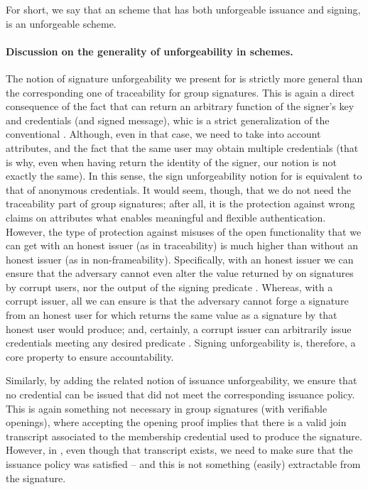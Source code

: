 For short, we say that an \UAS scheme that has both unforgeable issuance and
signing, is an unforgeable \UAS scheme.

\paragraph{Discussion on the generality of unforgeability in \UAS schemes.} %
The notion of signature unforgeability we present for \UAS is strictly more
general than the corresponding one of traceability for group signatures. This is
again a direct consequence of the fact that \Open can return an arbitrary
function of the signer's key and credentials (and signed message), whic is a
strict generalization of the conventional \Open. Although, even in that case, we
need to take into account attributes, and the fact that the same user may obtain
multiple credentials (that is why, even when having \Open return the identity of
the signer, our notion is not exactly the same). In this sense, the sign
unforgeability notion for \UAS is equivalent to that of anonymous
credentials. It would seem, though, that we do not need the traceability part of
group signatures; after all, it is the protection against wrong claims on
attributes what enables meaningful and flexible authentication. However, the
type of protection against misuses of the open functionality that we can
get with an honest issuer (as in traceability) is much higher than without an
honest issuer (as in non-frameability). Specifically, with an honest issuer we
can ensure that the adversary cannot even alter the value returned by \Open on
signatures by corrupt users, nor the output of the signing predicate \feval.
Whereas, with a corrupt issuer, all we can ensure is that
the adversary cannot forge a signature from an honest user for which \Open
returns the same value as a signature by that honest user would produce; and,
certainly, a corrupt issuer can arbitrarily issue credentials meeting any
desired predicate \feval. Signing unforgeability is, therefore, a core property
to ensure accountability.

Similarly, by adding the related notion of issuance unforgeability, we ensure
that no credential can be issued that did not meet the corresponding issuance
policy. This is again something not necessary in group signatures (with
verifiable openings), where \Judge accepting the opening proof implies that
there is a valid join transcript associated to the membership credential used
to produce the signature. However, in \UAS, even though that transcript exists,
we need to make sure that the issuance policy was satisfied -- and this is not
something (easily) extractable from the signature.


